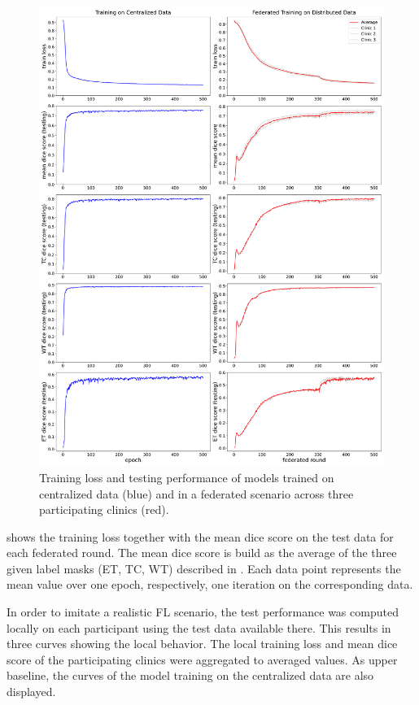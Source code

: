 \begin{figure}[htbp]
    \centerline{\includegraphics[width=1.0\textwidth]{1_Figures/BraTSexperiments_all.pdf}}
    \caption{Training loss and testing performance of models trained on centralized data (blue) and in a federated scenario across three participating clinics (red).}
\label{fig:BraTSplots}
\end{figure}


 shows the training loss together with the mean dice score on the test data for each federated round. The mean dice score is build as the average of the three given label masks (ET, TC, WT) described in . 
Each data point represents the mean value over one epoch, respectively, one iteration on the corresponding data.

In order to imitate a realistic FL scenario, the test performance was computed locally on each participant using the test data available there. This results in three curves showing the local behavior. The local training loss and mean dice score of the participating clinics were aggregated to averaged values.
As upper baseline, the curves of the model training on the centralized data are also displayed.


